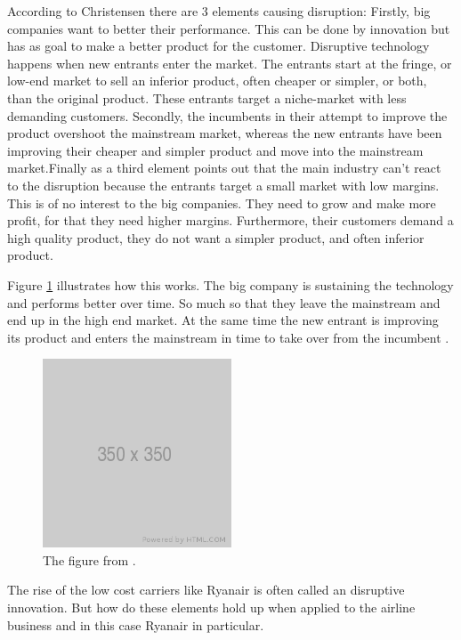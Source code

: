 \documentclass[a4paper, 11pt]{article}
\begin{document}
{{According to Christensen \cite{Christensen97} there are 3 elements causing disruption: Firstly, big companies want to better their performance. This can be done by innovation but has as goal to make a better product for the customer. Disruptive technology happens when new entrants enter the market. The entrants start at the fringe, or low-end market to sell an inferior product, often cheaper or simpler, or both, than the original product. These entrants target a niche-market with less demanding customers. Secondly, the incumbents in their attempt to improve the product overshoot the mainstream market, whereas the new entrants have been improving their cheaper and simpler product and move into the mainstream market.Finally as a third element \cite{Christensen97} points out that the main industry can't react to the disruption because the entrants target a small market with low margins. This is of no interest to the big companies. They need to grow and make more profit, for that they need higher margins. Furthermore, their customers demand a high quality product, they do not want a simpler product, and often inferior product.

Figure \ref{fig:graph1} illustrates how this works. The big company is sustaining the technology and performs better over time. So much so that they leave the mainstream and end up in the high end market. At the same time the new entrant is improving its product and enters the mainstream in time to take over from the incumbent \cite{Christensen97}.

\begin{figure}[h!]
    \centering
    \includegraphics[width=0.5\textwidth]{350.png}
    \caption{The figure from \cite{Christensen97}.}
    \label{fig:graph1}
\end{figure}

The rise of the low cost carriers like Ryanair is often called an disruptive innovation.
But how do these elements hold up when applied to the airline business and in this case Ryanair in particular.


}}
\end{document}
